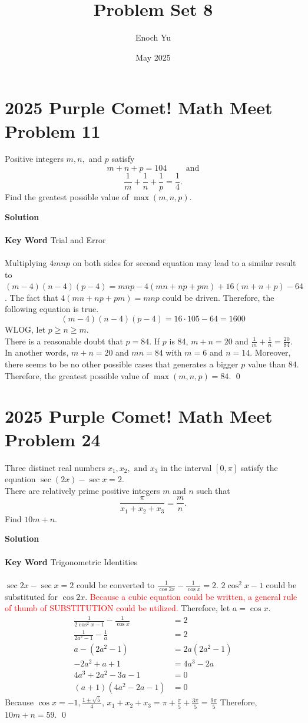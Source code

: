 \documentclass{article}
\title{Problem Set 8}
\author{Enoch Yu}
\date{May 2025}
\newenvironment{solution}{\begin{trivlist}\item[]{\bf Solution}}{\qed \end{trivlist}}
\begin{document}
\section*{2025 Purple Comet! Math Meet Problem 11}
Positive integers $m,n,$ and $p$ satisfy
\[
m+n+p=104\text{ }\text{ }\text{ }\text{ and}
\]
\[
\frac{1}{m}+\frac{1}{n}+\frac{1}{p}=\frac{1}{4}.
\]
Find the greatest possible value of $\max{(m,n,p)}$.
\begin{solution}
\\\\
\textbf{Key Word} Trial and Error
\\\\
Multiplying $4mnp$ on both sides for second equation may lead to a similar result to $(m-4)(n-4)(p-4)=mnp-4(mn+np+pm)+16(m+n+p)-64$. The fact that $4(mn+np+pm)=mnp$ could be driven. Therefore, the following equation is true.
\[
(m-4)(n-4)(p-4)=16\cdot105-64=1600
\]
WLOG, let $p \ge n \ge m$. \\
There is a reasonable doubt that $p=84$. If $p$ is 84, $m+n=20$ and $\frac{1}{m}+\frac{1}{n}=\frac{20}{84}$. In another words, $m+n=20$ and $mn=84$ with $m=6$ and $n=14$. Moreover, there seems to be no other possible cases that generates a bigger $p$ value than 84. Therefore, the greatest possible value of $\max{(m,n,p)}=\boxed{84}$.
\end{solution}

\section*{2025 Purple Comet! Math Meet Problem 24}
Three distinct real numbers $x_1,x_2,\text{ and }x_3$ in the interval $[0,\pi]$ satisfy the equation $\sec(2x)-\sec{x}=2$. \\
There are relatively prime positive integers $m$ and $n$ such that
\[
\frac{\pi}{x_1+x_2+x_3}=\frac{m}{n}.
\]
Find $10m+n$.
\begin{solution}
\\\\
\textbf{Key Word} Trigonometric Identities
\\\\
$\sec2x-\sec{x}=2$ could be converted to $\frac{1}{\cos2x}-\frac{1}{\cos{x}}=2$. $2\cos^2x-1$ could be substituted for $\cos2x$. \textcolor{red}{Because a cubic equation could be written, a general rule of thumb of SUBSTITUTION could be utilized.} Therefore, let $a=\cos{x}$.
\begin{align*}
\frac{1}{2\cos^2x-1}-\frac{1}{\cos{x}}&=2 \\
\frac{1}{2a^2-1}-\frac{1}{a}&=2 \\
a-(2a^2-1)&=2a(2a^2-1) \\
-2a^2+a+1&=4a^3-2a \\
4a^3+2a^2-3a-1&=0 \\
(a+1)(4a^2-2a-1)&=0
\end{align*}
Because $\cos{x}=-1,\frac{1\pm\sqrt{5}}{4}$, $x_1+x_2+x_3=\pi+\frac{\pi}{5}+\frac{3\pi}{5}=\frac{9\pi}{5}$ Therefore, $10m+n=\boxed{59}$.
\end{solution}
\end{document}
